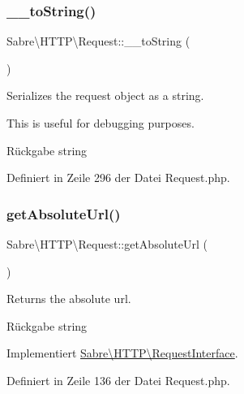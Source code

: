 \subsubsection{\texorpdfstring{\+\_\+\+\_\+to\+String()}{\_\_toString()}}
{\footnotesize\ttfamily Sabre\textbackslash{}\+H\+T\+T\+P\textbackslash{}\+Request\+::\+\_\+\+\_\+to\+String (\begin{DoxyParamCaption}{ }\end{DoxyParamCaption})}

Serializes the request object as a string.

This is useful for debugging purposes.

\begin{DoxyReturn}{Rückgabe}
string 
\end{DoxyReturn}


Definiert in Zeile 296 der Datei Request.\+php.

\mbox{\label{class_sabre_1_1_h_t_t_p_1_1_request_a112af52e6293b735ac82a8c92f83d637}} 
\subsubsection{\texorpdfstring{get\+Absolute\+Url()}{getAbsoluteUrl()}}
{\footnotesize\ttfamily Sabre\textbackslash{}\+H\+T\+T\+P\textbackslash{}\+Request\+::get\+Absolute\+Url (\begin{DoxyParamCaption}{ }\end{DoxyParamCaption})}

Returns the absolute url.

\begin{DoxyReturn}{Rückgabe}
string 
\end{DoxyReturn}


Implementiert \mbox{\hyperlink{interface_sabre_1_1_h_t_t_p_1_1_request_interface_a8c8267e6a7d901a0f63f66a2ecc59a91}{Sabre\textbackslash{}\+H\+T\+T\+P\textbackslash{}\+Request\+Interface}}.



Definiert in Zeile 136 der Datei Request.\+php.

\mbox{\label{class_sabre_1_1_h_t_t_p_1_1_request_a959a5d2f95e4545290e419906c4e417a}} 
